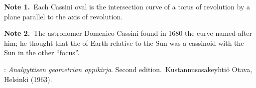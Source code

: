 \documentclass[12pt]{article}
\theoremstyle{definition}
\begin{document}
\textbf{Note 1.}\, Each Cassini oval is the intersection curve of a torus of revolution by a plane parallel to the axis of revolution.

\textbf{Note 2.}\, The astronomer Domenico Cassini found in 1680 the curve named after him; he thought that the  of Earth relative to the Sun was a cassinoid with the Sun in the other ``focus''.

\begin{thebibliography}{8}
: {\em Analyyttisen geometrian oppikirja}.  Second edition.\, Kustannusosakeyhti\"o Otava, Helsinki (1963).
\end{thebibliography} 




\end{document}
